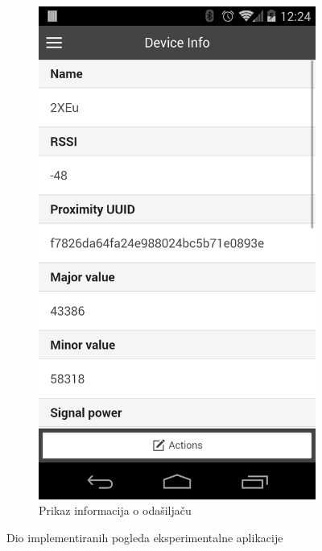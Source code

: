 \begin{figure}[H]
\begin{subfigure}[b]{0.45\textwidth}
        \includegraphics[scale=0.15]{pictures/experimental2}
        \caption{Prikaz informacija o odašiljaču}
        \label{fig:exp2}
    \end{subfigure}
    
    \caption{Dio implementiranih pogleda eksperimentalne aplikacije}
\end{figure}


